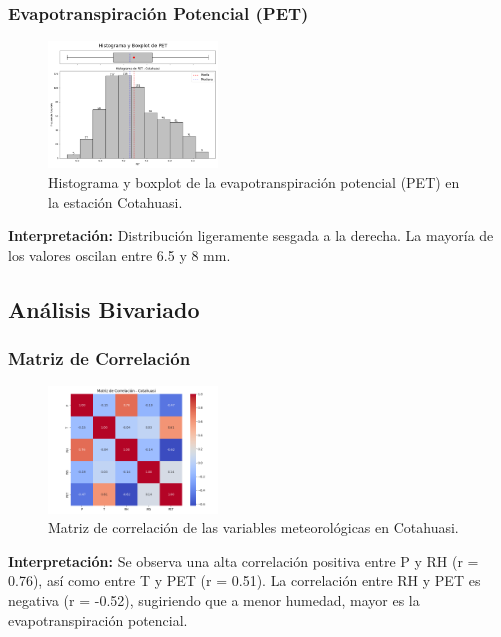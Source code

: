 \subsubsection*{Evapotranspiración Potencial (PET)}
\begin{figure}[H]
\centering
\includegraphics[width=0.4\textwidth]{resultados/por_estacion_meteorologica/Cotahuasi/PET_histograma.png}
\caption{Histograma y boxplot de la evapotranspiración potencial (PET) en la estación Cotahuasi.}
\label{fig:cotahuasi_PET}
\end{figure}
\textbf{Interpretación:} Distribución ligeramente sesgada a la derecha. La mayoría de los valores oscilan entre 6.5 y 8 mm.

\subsection{Análisis Bivariado}

\subsubsection*{Matriz de Correlación}
\begin{figure}[H]
\centering
\includegraphics[width=0.4\textwidth]{resultados/por_estacion_meteorologica/Cotahuasi/matriz_correlacion.png}
\caption{Matriz de correlación de las variables meteorológicas en Cotahuasi.}
\label{fig:cotahuasi_corr}
\end{figure}
\textbf{Interpretación:} Se observa una alta correlación positiva entre P y RH (r = 0.76), así como entre T y PET (r = 0.51). La correlación entre RH y PET es negativa (r = -0.52), sugiriendo que a menor humedad, mayor es la evapotranspiración potencial.

